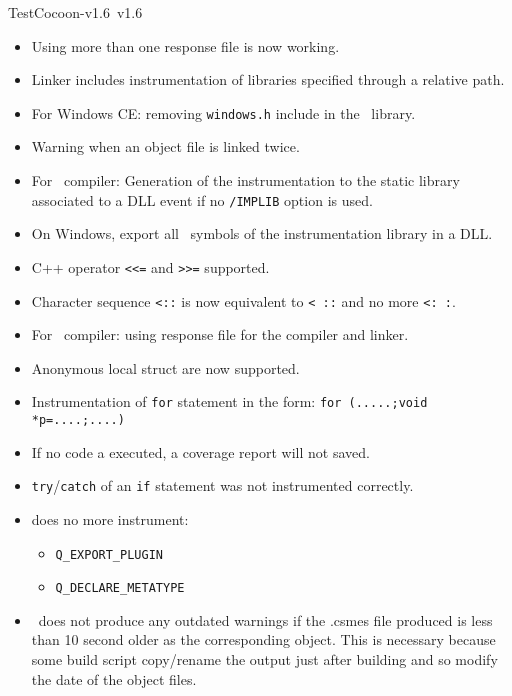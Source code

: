 \begin{TestCocoonDownload}
\begin{ReleaseNote}{TestCocoon-v1.6}{\TestCocoon\ v1.6}
\begin{description}
\begin{itemize}
    \item \BugFix Using more than one response file is now working.
    \item \BugFix Linker includes instrumentation of libraries specified through a relative path.
    \item \BugFix For Windows CE: removing \verb$windows.h$ include in the \CoverageScanner\ library.
    \item \BugFix Warning when an object file is linked twice.
    \item \BugFix For \VisualStudio\ compiler: Generation of the instrumentation to the static library associated to a DLL event if no \verb$/IMPLIB$ option is used.
    \item \BugFix On Windows, export all \CoverageScanner\ symbols of the instrumentation library in a DLL.
    \item \BugFix C++ operator \verb$<<=$ and \verb$>>=$ supported.
    \item \BugFix Character sequence \verb$<::$ is now equivalent to \verb$< ::$ and no more \verb$<: :$.
    \item \BugFix For \VisualStudio\ compiler: using response file for the compiler and linker.
    \item \BugFix Anonymous local struct are now supported.
    \item \BugFix Instrumentation of \verb$for$ statement in the form: \verb$for (.....;void *p=....;....)$
    \item \NewFeature If no code a executed, a coverage report will not saved.
    \item \BugFix \verb$try$/\verb$catch$ of an \verb$if$ statement was not instrumented correctly.
    \item \BugFix {} does no more instrument:
                  \begin{itemize}
                    \item \verb$Q_EXPORT_PLUGIN$
                    \item \verb$Q_DECLARE_METATYPE$
                  \end{itemize}
    \item \BugFix \CoverageScanner\ does not produce any outdated warnings if the .csmes file produced is less than 10 second older as the corresponding object.
                  This is necessary because some build script copy/rename the output just after building and so modify the date of the object files.
  \end{itemize}
\item[\CoverageBrowser]

\end{description}
\end{ReleaseNote}
\end{TestCocoonDownload}
